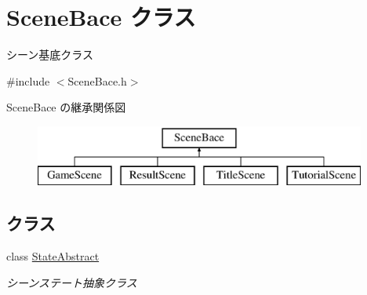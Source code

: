 \hypertarget{class_scene_bace}{}\section{Scene\+Bace クラス}
\label{class_scene_bace}


シーン基底クラス  




{\ttfamily \#include $<$Scene\+Bace.\+h$>$}

Scene\+Bace の継承関係図\begin{figure}[H]
\begin{center}
\leavevmode
\includegraphics[height=2.000000cm]{class_scene_bace}
\end{center}
\end{figure}
\subsection*{クラス}
\begin{DoxyCompactItemize}
\item 
class \mbox{\hyperlink{class_scene_bace_1_1_state_abstract}{State\+Abstract}}
\begin{DoxyCompactList}\small\item\em シーンステート抽象クラス \end{DoxyCompactList}\end{DoxyCompactItemize}
